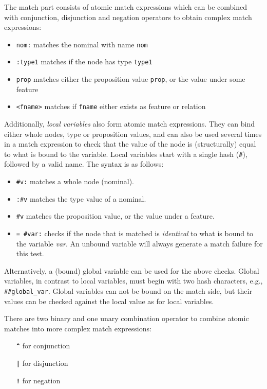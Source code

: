 \documentclass[11pt,a4paper]{article}
\newcommand{\cd}[1]{\texttt{#1}}
\begin{document}
{The match part consists of atomic match expressions which can be combined with
conjunction, disjunction and negation operators to obtain complex match
expressions:

\begin{itemize}
\item \cd{nom:} matches the nominal with name \cd{nom}
\item \cd{:type1} matches if the node has type \cd{type1}
\item \cd{prop} matches either the proposition value \cd{prop}, or the value
  under some feature
\item \cd{<fname>} matches if \cd{fname} either exists as feature or
  relation
\end{itemize}

Additionally, \emph{local variables} also form atomic match expressions. They
can bind either whole nodes, type or proposition values, and can also be used
several times in a match expression to check that the value of the node is
(structurally) equal to what is bound to the variable. Local variables start
with a single hash (\cd{\#}), followed by a valid name. The syntax is as
follows:

\begin{itemize}
\item \cd{\#v:} matches a whole node (nominal).
\item \cd{:\#v} matches the type value of a nominal.
\item \cd{\#v} matches the proposition value, or the value under a feature.
\item \cd{= \#var:} checks if the node that is matched is \emph{identical} to
  what is bound to the variable \emph{var}. An unbound variable will always
  generate a match failure for this test.
\end{itemize}

Alternatively, a (bound) global variable can be used for the above checks.
Global variables, in contrast to local variables, must begin with two hash
characters, e.g., \texttt{\#\#global\_var}. Global variables can not be bound
on the match side, but their values can be checked against the local value as
for local variables.

There are two binary and one unary combination operator to combine atomic
matches into more complex match expressions:

\begin{itemize}\addtolength{\itemsep}{-.5\itemsep}
\item[\textbf{\cd{\^}}] for conjunction
\item[\textbf{\cd{|}}] for disjunction
\item[\textbf{\cd{!}}] for negation
\end{itemize}

}
\end{document}
